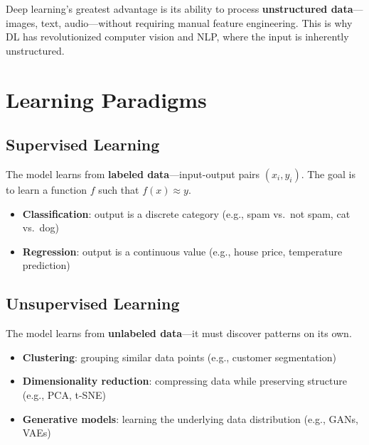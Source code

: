\documentclass[11pt,a4paper]{article}
\begin{document}
\begin{tcolorbox}[warnbox={Key Point}]
Deep learning's greatest advantage is its ability to process \textbf{unstructured data}---images, text, audio---without requiring manual feature engineering. This is why DL has revolutionized computer vision and NLP, where the input is inherently unstructured.
\end{tcolorbox}

\section{Learning Paradigms}

\subsection{Supervised Learning}

The model learns from \textbf{labeled data}---input-output pairs $(x_i, y_i)$. The goal is to learn a function $f$ such that $f(x) \approx y$.

\begin{itemize}[leftmargin=1.5em]
    \item \textbf{Classification}: output is a discrete category (e.g., spam vs.\ not spam, cat vs.\ dog)
    \item \textbf{Regression}: output is a continuous value (e.g., house price, temperature prediction)
\end{itemize}

\subsection{Unsupervised Learning}

The model learns from \textbf{unlabeled data}---it must discover patterns on its own.

\begin{itemize}[leftmargin=1.5em]
    \item \textbf{Clustering}: grouping similar data points (e.g., customer segmentation)
    \item \textbf{Dimensionality reduction}: compressing data while preserving structure (e.g., PCA, t-SNE)
    \item \textbf{Generative models}: learning the underlying data distribution (e.g., GANs, VAEs)
\end{itemize}
\end{document}
